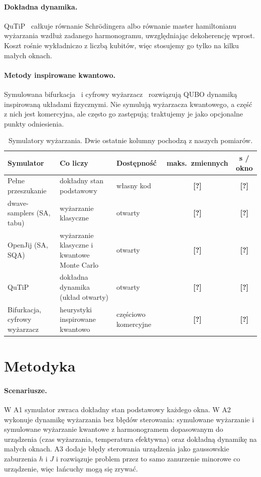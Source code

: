 \documentclass[11pt]{article}
\newcommand{\tofill}[1]{\textbf{[#1]}}
\begin{document}
\paragraph{Dokładna dynamika.}
QuTiP~\cite{johansson2013qutip,lambert2024qutip5} całkuje równanie
Schr\"{o}dingera albo równanie master hamiltonianu wyżarzania wzdłuż zadanego
harmonogramu, uwzględniając dekoherencję wprost. Koszt rośnie wykładniczo
z liczbą kubitów, więc stosujemy go tylko na kilku małych oknach.

\paragraph{Metody inspirowane kwantowo.}
Symulowana bifurkacja~\cite{goto2019sb} i cyfrowy wyżarzacz~\cite{aramon2019da}
rozwiązują QUBO dynamiką inspirowaną układami fizycznymi. Nie symulują
wyżarzacza kwantowego, a część z nich jest komercyjna, ale często go
zastępują; traktujemy je jako opcjonalne punkty odniesienia.

\begin{table}[t]
\caption{Symulatory wyżarzania. Dwie ostatnie kolumny pochodzą z naszych pomiarów.}
\label{tab:sims}
\centering
\small
\begin{tabular}{lllcc}
\toprule
Symulator & Co liczy & Dostępność & maks.\ zmiennych & s / okno \\
\midrule
Pełne przeszukanie & dokładny stan podstawowy & własny kod & \tofill{?} & \tofill{?} \\
dwave-samplers (SA, tabu) & wyżarzanie klasyczne & otwarty & \tofill{?} & \tofill{?} \\
OpenJij (SA, SQA) & wyżarzanie klasyczne i kwantowe Monte Carlo & otwarty & \tofill{?} & \tofill{?} \\
QuTiP & dokładna dynamika (układ otwarty) & otwarty & \tofill{?} & \tofill{?} \\
Bifurkacja, cyfrowy wyżarzacz & heurystyki inspirowane kwantowo & częściowo komercyjne & \tofill{?} & \tofill{?} \\
\bottomrule
\end{tabular}
\end{table}

\section{Metodyka}

\paragraph{Scenariusze.}
W A1 symulator zwraca dokładny stan podstawowy każdego okna. W A2 wykonuje
dynamikę wyżarzania bez błędów sterowania: symulowane wyżarzanie i symulowane
wyżarzanie kwantowe z harmonogramem dopasowanym do urządzenia (czas
wyżarzania, temperatura efektywna) oraz dokładną dynamikę na małych oknach. A3
dodaje błędy sterowania urządzenia jako gaussowskie zaburzenia $h$ i $J$
i rozwiązuje problem przez to samo zanurzenie minorowe co urządzenie, więc
łańcuchy mogą się zrywać.
\end{document}
